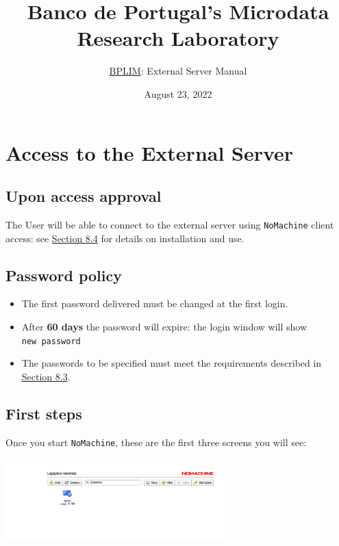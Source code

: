 \documentclass[
  11pt,
  a4paper,
]{article}
\title{Banco de Portugal's Microdata Research Laboratory}
\author{\href{https://bplim.bportugal.pt/}{BPLIM}: External Server
Manual}
\date{August 23, 2022}
\providecommand{\tightlist}{%
  \setlength{\itemsep}{0pt}\setlength{\parskip}{0pt}}
\begin{document}
\maketitle

{
\setcounter{tocdepth}{2}
\tableofcontents
}
\newpage

\hypertarget{access-to-the-external-server}{%
\section{Access to the External
Server}\label{access-to-the-external-server}}

\hypertarget{upon-access-approval}{%
\subsection{Upon access approval}\label{upon-access-approval}}

The User will be able to connect to the external server using
\texttt{NoMachine} client access: see
\protect\hyperlink{install_nomachine}{Section 8.4} for details on
installation and use.

\hypertarget{password-policy}{%
\subsection{Password policy}\label{password-policy}}

\begin{itemize}
\tightlist
\item
  The first password delivered must be changed at the first login.
\item
  After \textbf{60 days} the password will expire: the login window will
  show \texttt{new\ password}
\item
  The passwords to be specified must meet the requirements described in
  \protect\hyperlink{password}{Section 8.3}.
\end{itemize}

\hypertarget{first-steps}{%
\subsection{First steps}\label{first-steps}}

Once you start \texttt{NoMachine}, these are the first three screens you
will see:

\includegraphics[width=0.65\textwidth,height=\textheight]{./media/image1.png}
\end{document}
